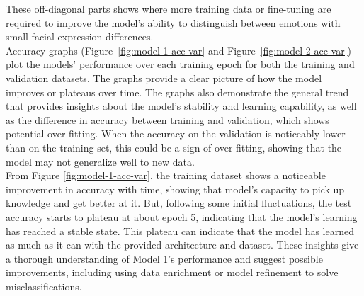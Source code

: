 These off-diagonal parts shows where more training data or fine-tuning are required to improve the model's ability to distinguish between emotions with small facial expression differences. 
\\
\indent 
Accuracy graphs (Figure~\ref{fig:model-1-acc-var} and Figure~\ref{fig:model-2-acc-var}) plot the models' performance over each training epoch for both the training and validation datasets.
The graphs provide a clear picture of how the model improves or plateaus over time. 
The graphs also demonstrate the general trend that provides insights about the model's stability and learning capability, as well as the difference in accuracy between training and validation, which shows potential over-fitting.
When the accuracy on the validation is noticeably lower than on the training set, this could be a sign of over-fitting, showing that the model may not generalize well to new data. 
\\
\indent From Figure \ref{fig:model-1-acc-var}, the training dataset shows a noticeable improvement in accuracy with time, showing that model's capacity to pick up knowledge and get better at it.
But, following some initial fluctuations, the test accuracy starts to plateau at about epoch 5, indicating that the model's learning has reached a stable state.
This plateau can indicate that the model has learned as much as it can with the provided architecture and dataset. 
These insights give a thorough understanding of Model 1's performance and suggest possible improvements, including using data enrichment or model refinement to solve misclassifications.

